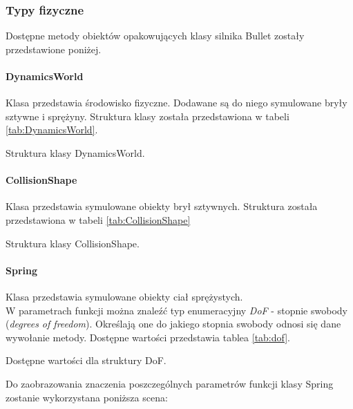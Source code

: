 \newpage
\subsubsection{Typy fizyczne}
Dostępne metody obiektów opakowujących klasy silnika Bullet zostały
przedstawione poniżej.

\paragraph{DynamicsWorld}
Klasa przedstawia środowisko fizyczne. Dodawane są do niego symulowane bryły
sztywne i sprężyny. Struktura klasy została przedstawiona w tabeli \ref{tab:DynamicsWorld}.\\
\begin{table}[H]

\caption{Struktura klasy DynamicsWorld.}
\label{tab:DynamicsWorld}
\end{table}

\newpage
\paragraph{CollisionShape}
Klasa przedstawia symulowane obiekty brył sztywnych. Struktura została
przedstawiona w tabeli \ref{tab:CollisionShape}\\

\begin{table}[H]

\caption{Struktura klasy CollisionShape.}
\label{tab:CollisionShape}
\end{table}

\paragraph{Spring}\label{sec:spring}
Klasa przedstawia symulowane obiekty ciał sprężystych.\\
W parametrach funkcji można znaleźć typ enumeracyjny \emph{DoF} -
stopnie swobody (\emph{degrees of freedom}). Określają one do jakiego stopnia
swobody odnosi się dane wywołanie metody. Dostępne wartości przedstawia tablea
\ref{tab:dof}.\\

\begin{table}[H]

\caption{Dostępne wartości dla struktury DoF.}
\label{tab:dof}
\end{table}

Do zaobrazowania znaczenia poszczególnych parametrów funkcji klasy Spring
zostanie wykorzystana poniższa scena:\\

